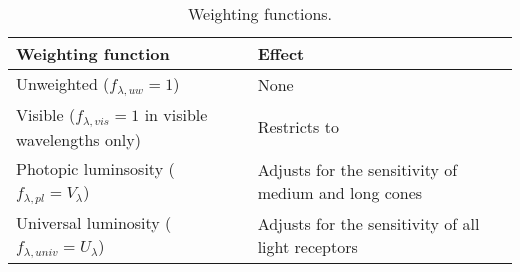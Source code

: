 

\begin{table}
\centering %
\caption{Weighting functions.}
\begin{tabular}{l l}
  \toprule
  Weighting function & Effect \\
  \midrule
  Unweighted ($f_{\lambda,uw} = 1$)  & None \\
  Visible ($f_{\lambda,vis} = 1$ in visible wavelengths only) & Restricts to \humaneyesensitivity{} \\
  Photopic luminsosity ($f_{\lambda,pl} = V_\lambda$) \cite{CVRL2008} & Adjusts for the sensitivity of medium and long cones \\
  Universal luminosity ($f_{\lambda,univ} = U_\lambda$) \cite{Rea2018} & Adjusts for the sensitivity of all light receptors \\
  \bottomrule
\end{tabular}
\label{tab:wfs}
\end{table}

